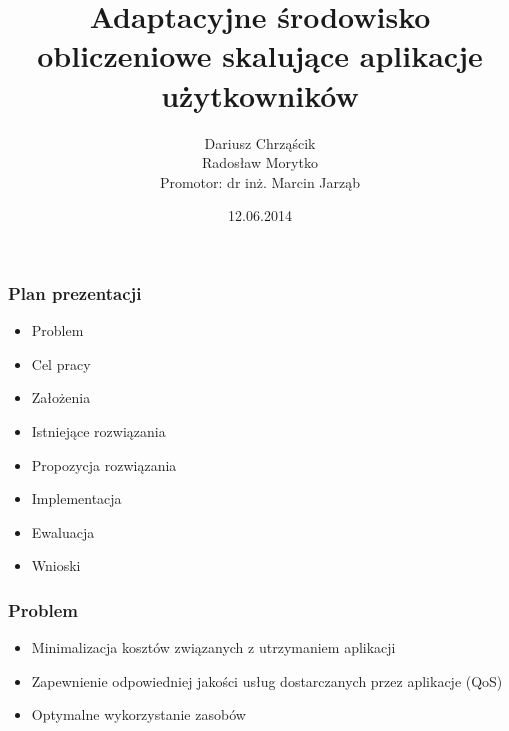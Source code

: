 \documentclass{beamer}
\title[]{Adaptacyjne środowisko obliczeniowe skalujące aplikacje użytkowników}
\author[D. Chrząścik, R. Morytko]{Dariusz Chrząścik\\
Radosław Morytko\\
Promotor: dr inż. Marcin Jarząb}
\date[2014]{12.06.2014}
\institute[AGH]
{Informatyka\\ 
Wydział Informatyki, Elektroniki i Telekomunikacji
}
\begin{document}
{
 \begin{frame}
   \titlepage
 \end{frame}
}


\begin{frame}
\frametitle{Plan prezentacji}

\begin{itemize}
	\item Problem
	\item Cel pracy
	\item Założenia
	\item Istniejące rozwiązania
	\item Propozycja rozwiązania
	\item Implementacja
	\item Ewaluacja
	\item Wnioski
\end{itemize}

\end{frame}



\begin{frame}
\frametitle{Problem}

\begin{itemize}
\item Minimalizacja kosztów związanych z utrzymaniem aplikacji
\item Zapewnienie odpowiedniej jakości usług dostarczanych przez aplikacje (QoS)
\item Optymalne wykorzystanie zasobów
\end{itemize}


\end{frame}
\end{document}
